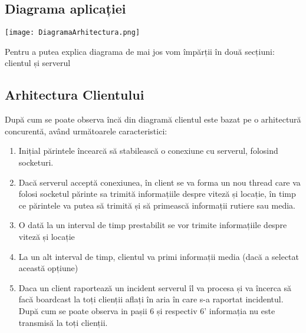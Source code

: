 \documentclass{article}
\begin{document}
\subsection{Diagrama aplicației}
\texttt{[image: DiagramaArhitectura.png]}

Pentru a putea explica diagrama de mai jos vom împărții în două secțiuni: clientul și serverul
\subsection{Arhitectura Clientului}
După cum se poate observa încă din diagramă clientul este bazat pe o arhitectură concurentă, având următoarele caracteristici:
\begin{enumerate}
    \item Inițial părintele încearcă să stabilească o conexiune cu serverul, folosind socketuri. 
    \item Dacă serverul acceptă conexiunea, în client se va forma un nou thread care va folosi socketul părinte sa trimită informațiile despre viteză și locație, în timp ce părintele va putea să trimită și să primească informații rutiere sau media.  
    \item O dată la un interval de timp prestabilit se vor trimite informațiile despre viteză și locație
    \item La un alt interval de timp, clientul va primi informații media (dacă a selectat această opțiune)
    \item Daca un client raportează un incident serverul îl va procesa și va încerca să facă boardcast la toți clienții aflați în aria în care s-a raportat incidentul. După cum se poate observa in pașii 6 și respectiv 6' informația nu este transmisă la toți clienții.
\end{enumerate}
\end{document}
